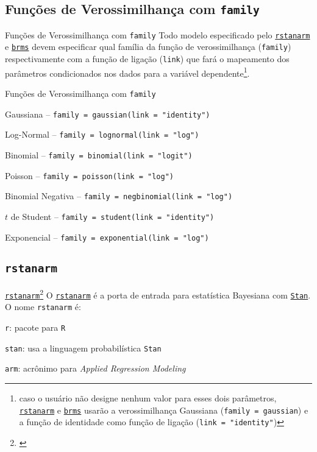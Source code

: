 \subsection{Funções de Verossimilhança com \texttt{family}}
\begin{frame}{Funções de Verossimilhança com \texttt{family}}
	Todo modelo especificado pelo \href{http://mc-stan.org/rstanarm/}{\texttt{rstanarm}} e
	\href{https://paul-buerkner.github.io/brms/}{\texttt{brms}} devem especificar qual
	família da função de verossimilhança (\texttt{family}) respectivamente com a
	função de ligação (\texttt{link}) que fará o mapeamento dos parâmetros
	condicionados nos dados para a variável
	dependente\footnote{caso o usuário não designe nenhum valor para esses dois parâmetros, \href{http://mc-stan.org/rstanarm/}{\texttt{rstanarm}} e \href{https://paul-buerkner.github.io/brms/}{\texttt{brms}} usarão a verossimilhança Gaussiana (\texttt{family = gaussian}) e a função de identidade como função de ligação (\texttt{link = "identity"})}.
\end{frame}

\begin{frame}{Funções de Verossimilhança com \texttt{family}}
	\begin{vfilleditems}
		\item Gaussiana -- \texttt{family = gaussian(link = "identity")}
		\item Log-Normal -- \texttt{family = lognormal(link = "log")}
		\item Binomial -- \texttt{family = binomial(link = "logit")}
		\item Poisson -- \texttt{family = poisson(link = "log")}
		\item Binomial Negativa -- \texttt{family = negbinomial(link = "log")}
		\item $t$ de Student -- \texttt{family = student(link = "identity")}
		\item Exponencial -- \texttt{family = exponential(link = "log")}
	\end{vfilleditems}
\end{frame}

\subsection{\texttt{rstanarm}}

\begin{frame}{\href{http://mc-stan.org/rstanarm/}{\texttt{rstanarm}}\footnote{\textcite{rstanarm}}}
	O \href{http://mc-stan.org/rstanarm/}{\texttt{rstanarm}} é a porta de
	entrada para estatística Bayesiana com \href{https://mc-stan.org}{\texttt{Stan}}.
	\vfill
	O nome \texttt{rstanarm} é:
	\begin{vfilleditems}
		\item \texttt{r}: pacote para \texttt{R}
		\item \texttt{stan}: usa a linguagem probabilística \texttt{Stan}
		\item \texttt{arm}: acrônimo para \textit{Applied Regression Modeling}
	\end{vfilleditems}
\end{frame}

